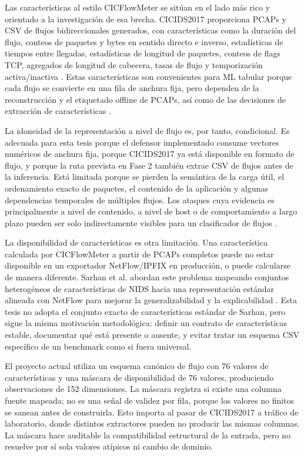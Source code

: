 Las características al estilo CICFlowMeter se sitúan en el lado más rico y orientado a la investigación de esa brecha. CICIDS2017 proporciona PCAPs y CSV de flujos bidireccionales generados, con características como la duración del flujo, conteos de paquetes y bytes en sentido directo e inverso, estadísticas de tiempos entre llegadas, estadísticas de longitud de paquetes, conteos de flags TCP, agregados de longitud de cabecera, tasas de flujo y temporización activa/inactiva \parencite{Sharafaldin2018CICIDS2017,Lashkari2017CICFlowMeter,CICIDS2017Web}. Estas características son convenientes para ML tabular porque cada flujo se convierte en una fila de anchura fija, pero dependen de la reconstrucción y el etiquetado offline de PCAPs, así como de las decisiones de extracción de características \parencite{Farrukh2022PayloadByte}.

La idoneidad de la representación a nivel de flujo es, por tanto, condicional. Es adecuada para esta tesis porque el defensor implementado consume vectores numéricos de anchura fija, porque CICIDS2017 ya está disponible en formato de flujo, y porque la ruta prevista en Fase 2 también extrae CSV de flujos antes de la inferencia. Está limitada porque se pierden la semántica de la carga útil, el ordenamiento exacto de paquetes, el contenido de la aplicación y algunas dependencias temporales de múltiples flujos. Los ataques cuya evidencia es principalmente a nivel de contenido, a nivel de host o de comportamiento a largo plazo pueden ser solo indirectamente visibles para un clasificador de flujos \parencite{Sperotto2010FlowIDS,Umer2017FlowIDS}.

La disponibilidad de características es otra limitación. Una característica calculada por CICFlowMeter a partir de PCAPs completos puede no estar disponible en un exportador NetFlow/IPFIX en producción, o puede calcularse de manera diferente. Sarhan et al. abordan este problema mapeando conjuntos heterogéneos de características de NIDS hacia una representación estándar alineada con NetFlow para mejorar la generalizabilidad y la explicabilidad \parencite{Sarhan2021}. Esta tesis no adopta el conjunto exacto de características estándar de Sarhan, pero sigue la misma motivación metodológica: definir un contrato de características estable, documentar qué está presente o ausente, y evitar tratar un esquema CSV específico de un benchmark como si fuera universal.

El proyecto actual utiliza un esquema canónico de flujo con 76 valores de características y una máscara de disponibilidad de 76 valores, produciendo observaciones de 152 dimensiones. La máscara registra si existe una columna fuente mapeada; no es una señal de validez por fila, porque los valores no finitos se sanean antes de construirla. Esto importa al pasar de CICIDS2017 a tráfico de laboratorio, donde distintos extractores pueden no producir las mismas columnas. La máscara hace auditable la compatibilidad estructural de la entrada, pero no resuelve por sí sola valores atípicos ni cambio de dominio.

